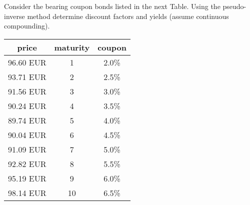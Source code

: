 \begin{question}
Consider the bearing coupon bonds listed in the next Table. Using the pseudo-inverse method determine discount factors and yields (assume continuous compounding).

\begin{table}[htb]
	\begin{center}
		\begin{tabular}{|c|c|c|}
			\hline
			\textbf{price} & \textbf{maturity} & \textbf{coupon} \\
			\hline
			96.60 EUR & 1 & 2.0\% \\
			\hline
			93.71 EUR & 2 & 2.5\% \\
			\hline
			91.56 EUR & 3 & 3.0\% \\
			\hline
			90.24 EUR & 4 & 3.5\% \\
			\hline
			89.74 EUR & 5 & 4.0\% \\
			\hline
			90.04 EUR & 6 & 4.5\% \\
			\hline
			91.09 EUR & 7 & 5.0\% \\
			\hline
 			92.82 EUR & 8 & 5.5\% \\
			\hline
			95.19 EUR & 9 & 6.0\% \\
			\hline
			98.14 EUR & 10 & 6.5\% \\
			\hline
		\end{tabular}
	\end{center}
\end{table}
	
\end{question}

